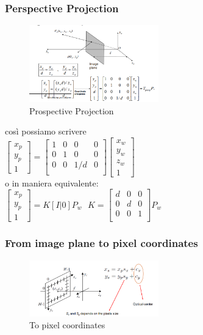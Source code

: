 \subsubsection{Perspective Projection}
\begin{figure}[H]
    \centering
    \includegraphics[width=0.5\textwidth]{images/PerspPro.png} 
    \caption{Prospective Projection}
    \label{fig:immagine}
\end{figure}
così possiamo scrivere \\
$\begin{bmatrix}
    x_p \\
    y_p \\
    1      
\end{bmatrix}=
\begin{bmatrix}
    1 & 0 & 0 & 0 \\
    0 & 1 & 0 & 0 \\
    0& 0 & 1/d & 0 \\   
\end{bmatrix}  
\begin{bmatrix}
    x_w \\
    y_w \\
    z_w  \\
    1  
\end{bmatrix}   $
\\ o in maniera equivalente: \\
$\begin{bmatrix}
    x_p \\
    y_p \\
    1      
\end{bmatrix}= K[I|0]P_w  \ \ \ 
K=\begin{bmatrix}
    d & 0 & 0 \\
    0 & d & 0 \\
    0 & 0 & 1  \\
\end{bmatrix} P_w$
\subsubsection{From image plane to pixel coordinates}
\begin{figure}[H]
    \centering
    \includegraphics[width=0.5\textwidth]{images/fromto.png} 
    \caption{To pixel coordinates}
    \label{fig:immagine}
\end{figure}
